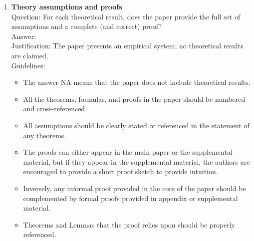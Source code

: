 \documentclass{article}
\begin{document}
\begin{enumerate}
\item {\bf Theory assumptions and proofs}\\
Question: For each theoretical result, does the paper provide the full set of assumptions and a complete (and correct) proof?\\
Answer: \answerNA{}\\
Justification: The paper presents an empirical system; no theoretical results are claimed.\\
Guidelines:
\begin{itemize}
\item The answer NA means that the paper does not include theoretical results.
\item All the theorems, formulas, and proofs in the paper should be numbered and cross-referenced.
\item All assumptions should be clearly stated or referenced in the statement of any theorems.
\item The proofs can either appear in the main paper or the supplemental material, but if they appear in the supplemental material, the authors are encouraged to provide a short proof sketch to provide intuition.
\item Inversely, any informal proof provided in the core of the paper should be complemented by formal proofs provided in appendix or supplemental material.
\item Theorems and Lemmas that the proof relies upon should be properly referenced.
\end{itemize}


\end{enumerate}
\end{document}
